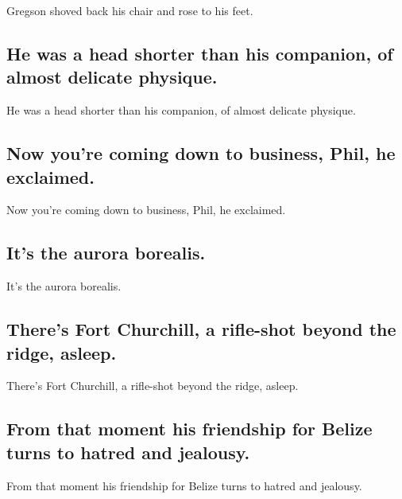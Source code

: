 \documentclass[]{article}
\begin{document}
Gregson shoved back his chair and rose to his feet.

\hypertarget{he-was-a-head-shorter-than-his-companion-of-almost-delicate-physique.}{%
\subsection{He was a head shorter than his companion, of almost delicate
physique.}\label{he-was-a-head-shorter-than-his-companion-of-almost-delicate-physique.}}

He was a head shorter than his companion, of almost delicate physique.

\hypertarget{now-youre-coming-down-to-business-phil-he-exclaimed.}{%
\subsection{Now you're coming down to business, Phil, he
exclaimed.}\label{now-youre-coming-down-to-business-phil-he-exclaimed.}}

Now you're coming down to business, Phil, he exclaimed.

\hypertarget{its-the-aurora-borealis.}{%
\subsection{It's the aurora borealis.}\label{its-the-aurora-borealis.}}

It's the aurora borealis.

\hypertarget{theres-fort-churchill-a-rifle-shot-beyond-the-ridge-asleep.}{%
\subsection{There's Fort Churchill, a rifle-shot beyond the ridge,
asleep.}\label{theres-fort-churchill-a-rifle-shot-beyond-the-ridge-asleep.}}

There's Fort Churchill, a rifle-shot beyond the ridge, asleep.

\hypertarget{from-that-moment-his-friendship-for-belize-turns-to-hatred-and-jealousy.}{%
\subsection{From that moment his friendship for Belize turns to hatred
and
jealousy.}\label{from-that-moment-his-friendship-for-belize-turns-to-hatred-and-jealousy.}}

From that moment his friendship for Belize turns to hatred and jealousy.
\end{document}
